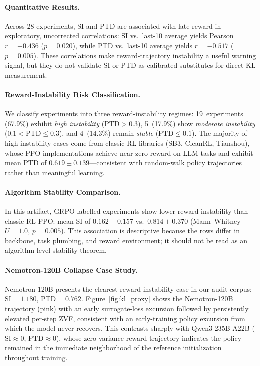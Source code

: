 \documentclass{article}
\begin{document}
\paragraph{Quantitative Results.}
Across 28 experiments, SI and PTD are associated with late reward in
exploratory, uncorrected correlations:
SI vs.\ last-10 average yields Pearson $r = -0.436$ ($p = 0.020$),
while PTD vs.\ last-10 average yields $r = -0.517$ ($p = 0.005$).
These correlations make reward-trajectory instability a useful warning signal,
but they do not validate SI or PTD as calibrated substitutes for direct KL
measurement.

\paragraph{Reward-Instability Risk Classification.}
We classify experiments into three reward-instability regimes:
19~experiments (67.9\%) exhibit \emph{high instability}
($\text{PTD} > 0.3$), 5~(17.9\%) show \emph{moderate instability}
($0.1 < \text{PTD} \leq 0.3$), and 4~(14.3\%) remain \emph{stable}
($\text{PTD} \leq 0.1$). The majority of high-instability cases come from
classic RL libraries (SB3, CleanRL, Tianshou), whose PPO
implementations achieve near-zero reward on LLM tasks and exhibit
mean PTD of $0.619 \pm 0.139$---consistent with random-walk policy
trajectories rather than meaningful learning.

\paragraph{Algorithm Stability Comparison.}
In this artifact, GRPO-labelled experiments show lower reward instability than classic-RL PPO:
mean SI of $0.162 \pm 0.157$ vs.\ $0.814 \pm 0.370$
(Mann--Whitney $U = 1.0$, $p = 0.005$).
This association is descriptive because the rows differ in backbone, task
plumbing, and reward environment; it should not be read as an algorithm-level
stability theorem.

\paragraph{Nemotron-120B Collapse Case Study.}
Nemotron-120B presents the clearest reward-instability case in our audit
corpus: $\text{SI} = 1.180$, $\text{PTD} = 0.762$.
Figure~\ref{fig:kl_proxy} shows the Nemotron-120B trajectory
(pink) with an early surrogate-loss excursion followed by persistently
elevated per-step ZVF, consistent with an early-training policy
excursion from which the model never recovers. This contrasts sharply with Qwen3-235B-A22B
($\text{SI} \approx 0$, $\text{PTD} \approx 0$), whose zero-variance
reward trajectory indicates the policy remained in the immediate
neighborhood of the reference initialization throughout training.
\end{document}
